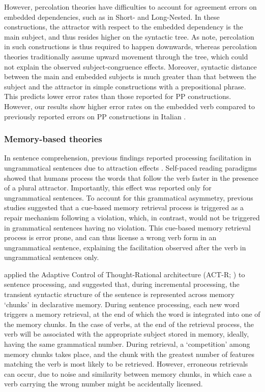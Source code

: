 However, percolation theories have difficulties to account for agreement errors on embedded dependencies, such as in Short- and Long-Nested. In these constructions, the attractor with respect to the embedded dependency is the main subject, and thus resides higher on the syntactic tree. As \citet{wagers2009agreement} note, percolation in such constructions is thus required to happen downwards, whereas percolation theories traditionally assume upward movement through the tree, which could not explain the observed subject-congruence effects. Moreover, syntactic distance between the main and embedded subjects is much greater than that between the subject and the attractor in simple constructions with a prepositional phrase. This predicts lower error rates than those reported for PP constructions. However, our results show higher error rates on the embedded verb compared to previously reported errors on PP constructions in Italian \citep{vigliocco1995constructing}.

\subsubsection{Memory-based theories}
In sentence comprehension, previous findings reported processing facilitation in ungrammatical sentences due to attraction effects \citep[e.g., ][]{pearlmutter1999agreement, wagers2009agreement, lago2015agreement}. Self-paced reading paradigms showed that humans  process the words that follow the verb faster in the presence of a plural attractor. Importantly, this effect was reported only for ungrammatical sentences. To account for this grammatical asymmetry, previous studies suggested that a cue-based memory retrieval process \citep{lewis2005activation} is triggered as a repair mechanism following a violation, which, in contrast, would not be triggered in grammatical sentences having no violation. This cue-based memory retrieval process is error prone, and can thus license a wrong verb form in an ungrammatical sentence, explaining the facilitation observed after the verb in ungrammatical sentences only. 


\citet{lewis2005activation} applied the Adaptive Control of Thought-Rational architecture (ACT-R; \citet{anderson2013architecture}) to sentence processing, and suggested that, during incremental processing, the transient syntactic structure of the sentence is represented across memory `chunks’ in declarative memory. During sentence processing, each new word triggers a memory retrieval, at the end of which the word is integrated into one of the memory chunks. In the case of verbs, at the end of the retrieval process, the verb will be associated with the appropriate subject stored in memory, ideally, having the same grammatical number. During retrieval, a `competition' among memory chunks takes place, and the chunk with the greatest number of features matching the verb is most likely to be retrieved. However, erroneous retrievals can occur, due to  noise and similarity between memory chunks, in which case a verb carrying the wrong number might be accidentally licensed. 

